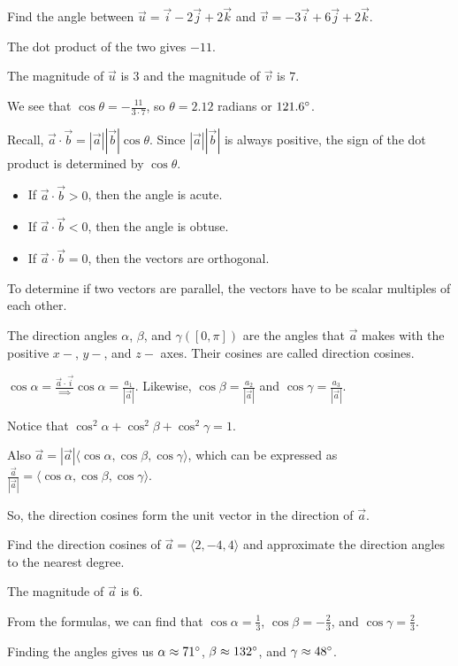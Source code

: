 \documentclass[../calc3.tex]{subfiles}
\begin{document}
\begin{example}
    Find the angle between $\vec{u}=\vec{i}-2\vec{j}+2\vec{k}$ and $\vec{v}=-3\vec{i}+6\vec{j}+2\vec{k}$.

    The dot product of the two gives $-11$.

    The magnitude of $\vec{u}$ is $3$ and the magnitude of $\vec{v}$ is $7$.

    We see that $\cos\theta = -\frac{11}{3\cdot 7}$, so $\theta = 2.12$ radians or $121.6\degree$.
\end{example}

Recall, $\vec{a}\cdot \vec{b}=|\vec{a}||\vec{b}|\cos\theta$. Since $|\vec{a}||\vec{b}|$ is always positive, the sign of the dot product is determined by $\cos\theta$.
\begin{itemize}
    \item If $\vec{a}\cdot \vec{b}>0$, then the angle is acute.
    \item If $\vec{a}\cdot \vec{b}<0$, then the angle is obtuse.
    \item If $\vec{a}\cdot \vec{b}=0$, then the vectors are orthogonal.
\end{itemize}

To determine if two vectors are parallel, the vectors have to be scalar multiples of each other.

\begin{definition}
    The direction angles $\alpha$, $\beta$, and $\gamma ([0,\pi])$ are the angles that $\vec{a}$ makes with the positive $x-$, $y-$, and $z-$ axes. Their cosines are called direction cosines.
\end{definition}
$\cos\alpha = \frac{\vec{a}\cdot \vec{i}} \implies \cos\alpha = \frac{a_1}{|\vec{a}|}$. Likewise, $\cos\beta = \frac{a_2}{|\vec{a}|}$ and $\cos\gamma = \frac{a_3}{|\vec{a}|}$.

Notice that $\cos^2\alpha + \cos^2\beta + \cos^2\gamma = 1$.

Also $\vec{a}=|\vec{a}|\langle \cos \alpha, \cos\beta, \cos\gamma \rangle$, which can be expressed as $\frac{\vec{a}}{|\vec{a}|}=\langle \cos\alpha, \cos\beta, \cos\gamma\rangle$.

So, the direction cosines form the unit vector in the direction of $\vec{a}$.

\begin{example}
    Find the direction cosines of $\vec{a}=\langle 2,-4,4\rangle$ and approximate the direction angles to the nearest degree.

    The magnitude of $\vec{a}$ is $6$.

    From the formulas, we can find that $\cos\alpha = \frac{1}{3}$, $\cos\beta = -\frac{2}{3}$, and $\cos\gamma = \frac{2}{3}$.

    Finding the angles gives us $\alpha \approx 71\degree$, $\beta \approx 132\degree$, and $\gamma \approx 48\degree$.
\end{example}
\end{document}
